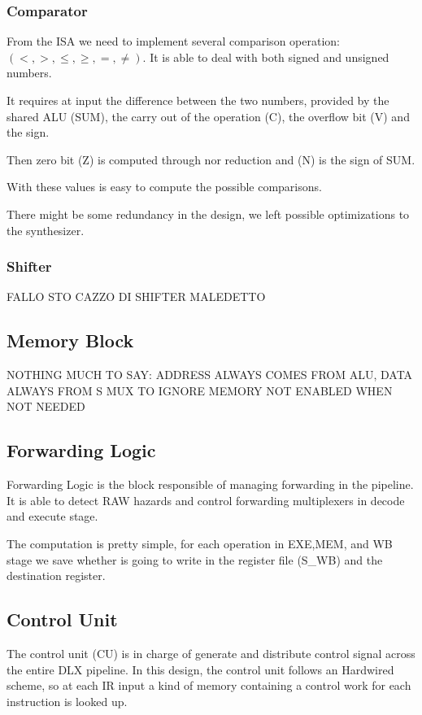 \documentclass[12pt]{article}
\begin{document}
\subsubsection{Comparator}
From the ISA we need to implement several comparison operation: $(<, >, \leq, \geq, =, \neq)$.
It is able to deal with both signed and unsigned numbers.

It requires at input the difference between the two numbers, provided by the shared ALU (SUM), the carry out of the operation (C), the overflow bit (V) and the sign.

Then zero bit (Z) is computed through nor reduction and (N) is the sign of SUM.

With these values is easy to compute the possible comparisons.

There might be some redundancy in the design, we left possible optimizations to the synthesizer.

\subsubsection{Shifter}
FALLO STO CAZZO DI SHIFTER MALEDETTO

\subsection{Memory Block}
NOTHING MUCH TO SAY: ADDRESS ALWAYS COMES FROM ALU, DATA ALWAYS FROM S
MUX TO IGNORE MEMORY
NOT ENABLED WHEN NOT NEEDED

\subsection{Forwarding Logic}
Forwarding Logic is the block responsible of managing forwarding in the pipeline. It is able to detect RAW hazards and control forwarding multiplexers in decode and execute stage.

The computation is pretty simple, for each operation in EXE,MEM, and WB stage we save whether is going to write in the register file (S\_WB) and the destination register.


\subsection{Control Unit}
The control unit (CU) is in charge of generate and distribute control signal across the entire DLX pipeline.
In this design, the control unit follows an Hardwired scheme, so at each IR input a kind of memory containing a control work for each instruction is looked up.
\end{document}
